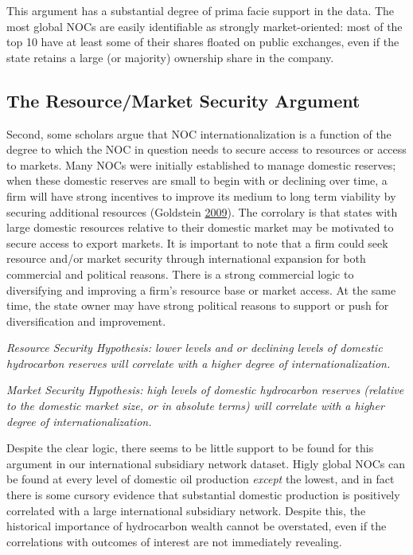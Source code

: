 \documentclass[11pt,]{book}
\begin{document}
This argument has a substantial degree of prima facie support in the data. The most global NOCs are easily identifiable as strongly market-oriented: most of the top 10 have at least some of their shares floated on public exchanges, even if the state retains a large (or majority) ownership share in the company.

\hypertarget{the-resourcemarket-security-argument}{%
\subsection{The Resource/Market Security Argument}\label{the-resourcemarket-security-argument}}

Second, some scholars argue that NOC internationalization is a function of the degree to which the NOC in question needs to secure access to resources or access to markets. Many NOCs were initially established to manage domestic reserves; when these domestic reserves are small to begin with or declining over time, a firm will have strong incentives to improve its medium to long term viability by securing additional resources (Goldstein \protect\hyperlink{ref-goldstein_new_2009}{2009}). The corrolary is that states with large domestic resources relative to their domestic market may be motivated to secure access to export markets. It is important to note that a firm could seek resource and/or market security through international expansion for both commercial and political reasons. There is a strong commercial logic to diversifying and improving a firm's resource base or market access. At the same time, the state owner may have strong political reasons to support or push for diversification and improvement.

\emph{Resource Security Hypothesis: lower levels and or declining levels of domestic hydrocarbon reserves will correlate with a higher degree of internationalization.}

\emph{Market Security Hypothesis: high levels of domestic hydrocarbon reserves (relative to the domestic market size, or in absolute terms) will correlate with a higher degree of internationalization.}

Despite the clear logic, there seems to be little support to be found for this argument in our international subsidiary network dataset. Higly global NOCs can be found at every level of domestic oil production \emph{except} the lowest, and in fact there is some cursory evidence that substantial domestic production is positively correlated with a large international subsidiary network. Despite this, the historical importance of hydrocarbon wealth cannot be overstated, even if the correlations with outcomes of interest are not immediately revealing.
\end{document}
